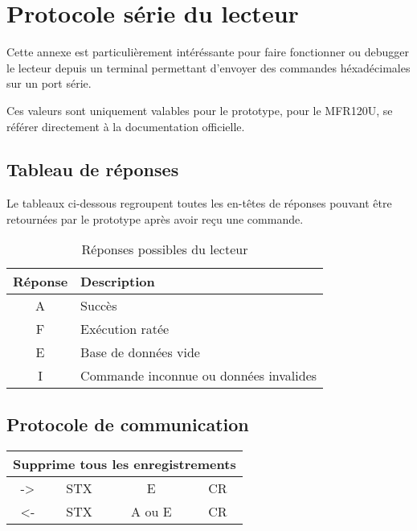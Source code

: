 \chapter{Protocole série du lecteur}

    Cette annexe est particulièrement intéréssante pour faire fonctionner ou debugger
le lecteur depuis un terminal permettant d'envoyer des commandes héxadécimales sur
un port série. 

    Ces valeurs sont uniquement valables pour le prototype, pour le MFR120U, se 
référer directement à la documentation officielle.

\section{Tableau de réponses}

    Le tableaux ci-dessous regroupent toutes les en-têtes de réponses pouvant être
retournées par le prototype après avoir reçu une commande.

\begin{table}[h]
\begin{center}

    \begin{tabular}{|c|M{3cm}|}
    \hline
    Réponse & Description \tabularnewline
    \hline
    A & Succès \tabularnewline
    \hline
    F & Exécution ratée \tabularnewline
    \hline
    E & Base de données vide \tabularnewline
    \hline
    I & Commande inconnue ou données invalides \tabularnewline
    \hline
    \end{tabular}

\end{center}
\caption{Réponses possibles du lecteur}
\label{Réponses possibles du lecteur}
\end{table}





\newpage
\section{Protocole de communication}

\begin{table}[h]
\begin{center}
    \begin{tabular}{|c|c|c|c|c|}
    \hline
    \multicolumn{5}{|c|}{Supprime tous les enregistrements} \\
    \hline
    -> & STX & \multicolumn{2}{c|}{E} & CR \\
    \hline
    <- & STX & \multicolumn{2}{c|}{A ou E} & CR \\
    \hline
    \end{tabular} 
\end{center}
\end{table}

